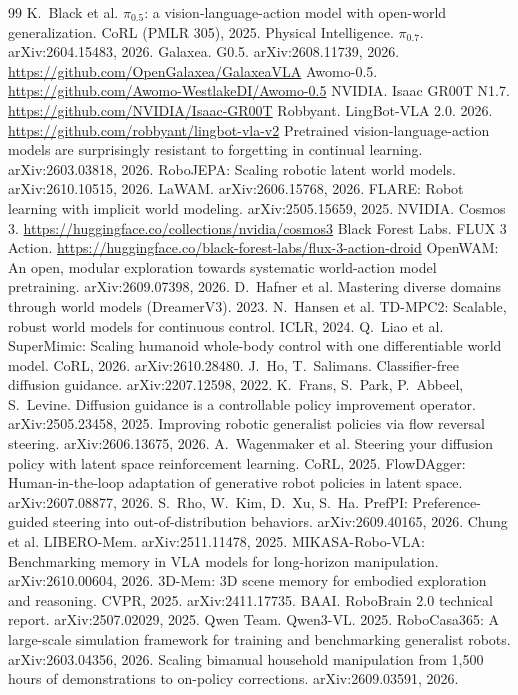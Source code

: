 \documentclass[11pt,a4paper]{article}
\newcommand{\pzf}{$\pi_{0.5}$}
\newcommand{\pzs}{$\pi_{0.7}$}
\begin{document}
\begin{thebibliography}{99}\small
{} K.~Black et al. \pzf: a vision-language-action model with open-world generalization. CoRL (PMLR 305), 2025.
 Physical Intelligence. \pzs. arXiv:2604.15483, 2026.
 Galaxea. G0.5. arXiv:2608.11739, 2026. \url{https://github.com/OpenGalaxea/GalaxeaVLA}
 Awomo-0.5. \url{https://github.com/Awomo-WestlakeDI/Awomo-0.5}
 NVIDIA. Isaac GR00T N1.7. \url{https://github.com/NVIDIA/Isaac-GR00T}
 Robbyant. LingBot-VLA 2.0. 2026. \url{https://github.com/robbyant/lingbot-vla-v2}
 Pretrained vision-language-action models are surprisingly resistant to forgetting in continual learning. arXiv:2603.03818, 2026.
 RoboJEPA: Scaling robotic latent world models. arXiv:2610.10515, 2026.
 LaWAM. arXiv:2606.15768, 2026.
 FLARE: Robot learning with implicit world modeling. arXiv:2505.15659, 2025.
 NVIDIA. Cosmos 3. \url{https://huggingface.co/collections/nvidia/cosmos3}
 Black Forest Labs. FLUX 3 Action. \url{https://huggingface.co/black-forest-labs/flux-3-action-droid}
 OpenWAM: An open, modular exploration towards systematic world-action model pretraining. arXiv:2609.07398, 2026.
 D.~Hafner et al. Mastering diverse domains through world models (DreamerV3). 2023.
 N.~Hansen et al. TD-MPC2: Scalable, robust world models for continuous control. ICLR, 2024.
 Q.~Liao et al. SuperMimic: Scaling humanoid whole-body control with one differentiable world model. CoRL, 2026. arXiv:2610.28480.
 J.~Ho, T.~Salimans. Classifier-free diffusion guidance. arXiv:2207.12598, 2022.
 K.~Frans, S.~Park, P.~Abbeel, S.~Levine. Diffusion guidance is a controllable policy improvement operator. arXiv:2505.23458, 2025.
 Improving robotic generalist policies via flow reversal steering. arXiv:2606.13675, 2026.
 A.~Wagenmaker et al. Steering your diffusion policy with latent space reinforcement learning. CoRL, 2025.
 FlowDAgger: Human-in-the-loop adaptation of generative robot policies in latent space. arXiv:2607.08877, 2026.
 S.~Rho, W.~Kim, D.~Xu, S.~Ha. PrefPI: Preference-guided steering into out-of-distribution behaviors. arXiv:2609.40165, 2026.
 Chung et al. LIBERO-Mem. arXiv:2511.11478, 2025.
 MIKASA-Robo-VLA: Benchmarking memory in VLA models for long-horizon manipulation. arXiv:2610.00604, 2026.
 3D-Mem: 3D scene memory for embodied exploration and reasoning. CVPR, 2025. arXiv:2411.17735.
 BAAI. RoboBrain 2.0 technical report. arXiv:2507.02029, 2025.
 Qwen Team. Qwen3-VL. 2025.
 RoboCasa365: A large-scale simulation framework for training and benchmarking generalist robots. arXiv:2603.04356, 2026.
 Scaling bimanual household manipulation from 1,500 hours of demonstrations to on-policy corrections. arXiv:2609.03591, 2026.
\end{thebibliography}
\end{document}
